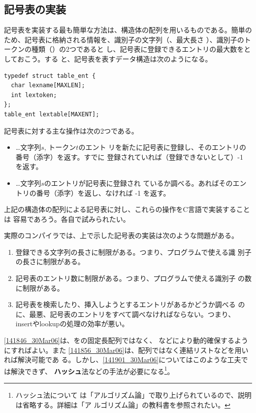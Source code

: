 \subsection{記号表の実装}

記号表を実装する最も簡単な方法は、構造体の配列を用いるものである。簡単の
ため、記号表に格納される情報を、識別子の文字列（、最大長さ
）、識別子のトークンの種類（）の2つであると
し、記号表に登録できるエントリの最大数をとしておこう。する
と、記号表を表すデータ構造は次のようになる。

\begin{lstlisting}
typedef struct table_ent {
  char lexname[MAXLEN];
  int lextoken;
};
table_ent lextable[MAXENT];
\end{lstlisting}

記号表に対する主な操作は次の2つである。
\begin{itemize}
 \item {}…文字列$s$, トークン$t$のエント
       リを新たに記号表に登録し、そのエントリの番号（添字）を返す。すでに
       登録されていれば（登録できないとして）-1 を返す。
 \item {}…文字列$s$のエントリが記号表に登録され
       ているか調べる。あればそのエントリの番号（添字）を返し、なければ
       -1 を返す。
\end{itemize}

上記の構造体の配列による記号表に対し、これらの操作をC言語で実装することは
容易であろう。各自で試みられたい。

実際のコンパイラでは、上で示した記号表の実装は次のような問題がある。
\begin{enumerate}
 \item 登録できる文字列の長さに制限がある。つまり、プログラムで使える識
       別子の長さに制限がある。
       \label{141846_30Mar06}
 \item 記号表のエントリ数に制限がある。つまり、プログラムで使える識別子
       の数に制限がある。
       \label{141856_30Mar06}
 \item 記号表を検索したり、挿入しようとするエントリがあるかどうか調べる
       のに、最悪、記号表のエントリをすべて調べなければならない。つまり、
       insertやlookupの処理の効率が悪い。
       \label{141901_30Mar06}
\end{enumerate}

\ref{141846_30Mar06}は、をの固定長配列ではなく、
などにより動的確保するようにすればよい。また
\ref{141856_30Mar06}は、配列ではなく連結リストなどを用いれば解決可能であ
る。しかし、\ref{141901_30Mar06}についてはこのような工夫では解決できず、
{\bfseries ハッシュ}法などの手法が必要になる\footnote{ハッシュ法について
は「アルゴリズム論」で取り上げられているので、説明は省略する。詳細は「ア
ルゴリズム論」の教科書\cite{エイホ77}を参照されたい。}。

